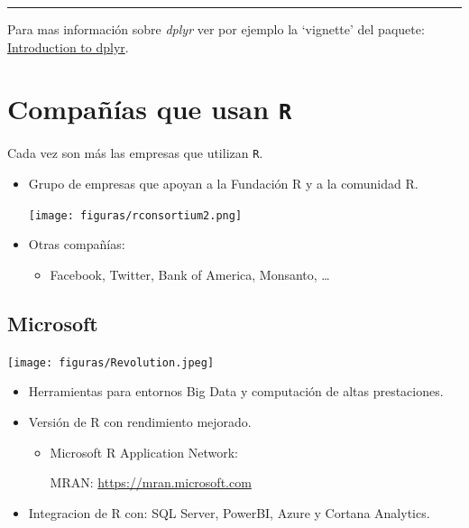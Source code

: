 \documentclass[
]{book}
\providecommand{\tightlist}{%
  \setlength{\itemsep}{0pt}\setlength{\parskip}{0pt}}
\theoremstyle{break}
\theoremstyle{nonumberplain}
\begin{document}
\begin{center}\rule{0.5\linewidth}{0.5pt}\end{center}

Para mas información sobre \emph{dplyr} ver por ejemplo la `vignette' del paquete:\\
\href{http://cran.rstudio.com/web/packages/dplyr/vignettes/introduction.html}{Introduction to dplyr}.

\hypertarget{compauxf1uxedas-que-usan-r}{%
\chapter{\texorpdfstring{Compañías que usan \texttt{R}}{Compañías que usan R}}\label{compauxf1uxedas-que-usan-r}}

Cada vez son más las empresas que utilizan \texttt{R}.

\begin{itemize}
\item
  Grupo de empresas que apoyan a la Fundación R y a la comunidad R.

  \texttt{[image: figuras/rconsortium2.png]}
\item
  Otras compañías:

  \begin{itemize}
  \tightlist
  \item
    Facebook, Twitter, Bank of America, Monsanto, \ldots{}
  \end{itemize}
\end{itemize}

\hypertarget{microsoft}{%
\section{Microsoft}\label{microsoft}}

\texttt{[image: figuras/Revolution.jpeg]}

\begin{itemize}
\item
  Herramientas para entornos Big Data y computación de altas prestaciones.
\item
  Versión de R con rendimiento mejorado.

  \begin{itemize}
  \item
    Microsoft R Application Network:

    MRAN: \url{https://mran.microsoft.com}
  \end{itemize}
\item
  Integracion de R con: SQL Server, PowerBI, Azure y Cortana
  Analytics.
\end{itemize}
\end{document}
